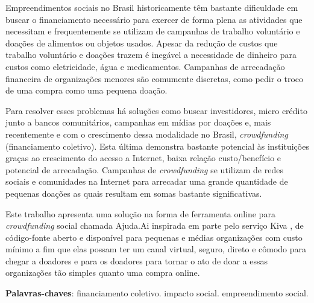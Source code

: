 \begin{resumo}
Empreendimentos sociais no Brasil historicamente têm bastante dificuldade em buscar o financiamento necessário para exercer de forma plena as atividades que necessitam e frequentemente se utilizam de campanhas de trabalho voluntário e doações de alimentos ou objetos usados. Apesar da redução de custos que trabalho voluntário e doações trazem é inegável a necessidade de dinheiro para custos como eletricidade, água e medicamentos. Campanhas de arrecadação financeira de organizações menores são comumente discretas, como pedir o troco de uma compra como uma pequena doação.

Para resolver esses problemas há soluções como buscar investidores, micro crédito junto a bancos comunitários, campanhas em mídias por doações e, mais recentemente e com o crescimento dessa modalidade no Brasil, \emph{crowdfunding} (financiamento coletivo). Esta última demonstra bastante potencial às instituições graças ao crescimento do acesso a Internet, baixa relação custo/benefício e potencial de arrecadação. Campanhas de \emph{crowdfunding} se utilizam de redes sociais e comunidades na Internet para arrecadar uma grande quantidade de pequenas doações as quais resultam em somas bastante significativas.

Este trabalho apresenta uma solução na forma de ferramenta online para \emph{crowdfunding} social chamada Ajuda.Ai inspirada em parte pelo serviço Kiva \cite{flannery2007kiva}, de código-fonte aberto e disponível para pequenas e médias organizações com custo mínimo a fim que elas possam ter um canal virtual, seguro, direto e cômodo para chegar a doadores e para os doadores para tornar o ato de doar a essas organizações tão simples quanto uma compra online.

\vspace{\onelineskip}
\noindent
\textbf{Palavras-chaves}: financiamento coletivo. impacto social. empreendimento social.
\end{resumo}